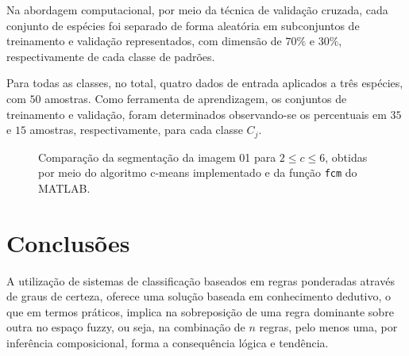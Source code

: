 \documentclass[12pt,a4paper]{article}
\numberwithin{equation}{section}
\begin{document}
{Na abordagem computacional, por meio da técnica de validação cruzada, cada conjunto de espécies foi separado de forma aleatória em subconjuntos de treinamento e validação representados, com dimensão de $70\%$ e $30\%$, respectivamente de cada classe de padrões.

Para todas as classes, no total, quatro dados de entrada aplicados a três espécies, com $50$ amostras. Como ferramenta de aprendizagem, os conjuntos de treinamento e validação, foram determinados observando-se os percentuais em $35$ e $15$ amostras, respectivamente, para cada classe $C_{j}$.

\begin{figure}[!htbp]
	\centering
	
	\caption{Comparação da segmentação da imagem 01 para $2 \leq c \leq 6$, obtidas por meio do algoritmo c-means implementado e da função \texttt{fcm} do MATLAB.}
	\label{fig:resul_img01}
\end{figure}

\newpage
\section{Conclusões}

A utilização de sistemas de classificação baseados em regras ponderadas através de graus de certeza, oferece uma solução baseada em conhecimento dedutivo, o que em termos práticos, implica na sobreposição de uma regra dominante sobre outra no espaço fuzzy, ou seja, na combinação de $n$ regras, pelo menos uma, por inferência composicional, forma a consequência lógica e tendência.

}
\end{document}
